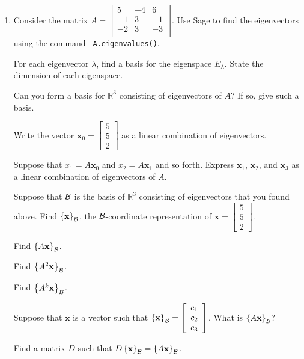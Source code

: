 \documentclass[12pt]{article}
\newcommand{\vs}[1]{\vspace{#1in}}
\newcommand{\xvec}{{\mathbf x}}
\newcommand{\real}{{\mathbb R}}
\newcommand{\threevec}[3]{\left[\begin{array}{r}#1 \\ #2 \\ #3
  \end{array}\right]}
\newcommand{\bcal}{{\cal B}}
\newcommand{\coords}[2]{\left\{#1\right\}_{#2}}
\begin{document}
\begin{enumerate}
  \vs{1}


  

\item
  Consider the matrix
  $A =
  \left[
    \begin{array}{ccc}
      5 & -4 & 6 \\
      -1 & 3 & -1 \\
      -2 & 3 & -3 \\
    \end{array}
  \right]
  $.
  Use Sage to find the eigenvectors using the command {\tt
    A.eigenvalues()}.

  \vs{1}
  For each eigenvector $\lambda$, find a basis for the eigenspace
  $E_\lambda$.  State the dimension of each eigenspace.

  \vs{3}
  Can you form a basis for $\real^3$ consisting of eigenvectors of
  $A$?  If so, give such a basis.

  \vs{1}
  \newpage
  Write the vector $\xvec_0 = \threevec552$ as a linear combination of
  eigenvectors.

  \vs{1.5}
  Suppose that $x_1=A\xvec_0$ and $x_2=A\xvec_1$ and so forth.
  Express $\xvec_1$, $\xvec_2$, and $\xvec_3$ as a linear combination
  of eigenvectors of $A$.

  \vs{1}
  Suppose that $\bcal$ is the basis of $\real^3$ consisting of
  eigenvectors that you found above.  Find $\coords{\xvec}{\bcal}$,
  the $\bcal$-coordinate representation of $\xvec=\threevec552$.

  \vs{1}
  Find $\coords{A\xvec}{\bcal}$.

  \vs{1}
  Find $\coords{A^2\xvec}{\bcal}$.

  \vs{1}
  Find $\coords{A^k\xvec}{\bcal}$.

  \vs{1}
  Suppose that $\xvec$ is a vector such that
  $\coords{\xvec}{\bcal} = \threevec{c_1}{c_2}{c_3}$.  What is
  $\coords{A\xvec}{\bcal}$?

  \vs{1}
  Find a matrix $D$ such that
  $D\coords{\xvec}{\bcal}=\coords{A\xvec}{\bcal}$.  
  
  \vs{1}

\end{enumerate}
\end{document}
